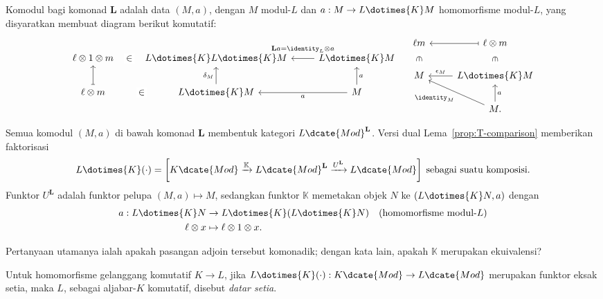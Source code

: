 Komodul bagi komonad $\mathbf{L}$ adalah data $(M,a)$, dengan $M$ modul-$L$
dan $a:M\to L\dotimes{K}M$ homomorfisme modul-$L$, yang disyaratkan membuat
diagram berikut komutatif:
\[\begin{tikzcd}
	\ell \otimes 1 \otimes m \arrow[phantom, r, "\in" description] & L \dotimes{K} L \dotimes{K} M & L \dotimes{K} M \arrow[l, "{\mathbf{L}a = \identity_L \otimes a}"' inner sep=0.6em] \\
	\ell \otimes m \arrow[phantom, r, "\in" description] \arrow[mapsto, u] & L \dotimes{K} M \arrow[u, "\delta_M"] & M \arrow[l, "a"] \arrow[u, "a"']
\end{tikzcd} \quad \begin{tikzcd}
	\ell m \arrow[phantom, d, "\in" description, sloped] & \ell \otimes m \arrow[phantom, d, "\in" description, sloped] \arrow[mapsto, l] \\
	M & L \dotimes{K} M \arrow[l, "\epsilon_M"'] \\
	& M. \arrow[lu, "\identity_M"] \arrow[u, "a"']
\end{tikzcd}\]

Semua komodul $(M,a)$ di bawah komonad $\mathbf{L}$ membentuk kategori
$L\dcate{Mod}^{\mathbf{L}}$. Versi dual Lema~\ref{prop:T-comparison}
memberikan faktorisasi
\[ L \dotimes{K} (\cdot) = \left[ K\dcate{Mod} \xrightarrow{\mathbb{K}} L\dcate{Mod}^{\mathbf{L}} \xrightarrow{U^{\mathbf{L}}} L\dcate{Mod} \right] \; \text{sebagai suatu komposisi}. \]
Funktor $U^{\mathbf{L}}$ adalah funktor pelupa $(M,a)\mapsto M$, sedangkan
funktor $\mathbb{K}$ memetakan objek $N$ ke $(L\dotimes{K}N,a)$ dengan
\begin{equation}\label{eqn:N-comonad-action}
	\begin{aligned}
		a: L \dotimes{K} N & \to L \dotimes{K} (L \dotimes{K} N) \quad \text{(homomorfisme modul-$L$)} \\
		\ell \otimes x & \mapsto \ell \otimes 1 \otimes x.
	\end{aligned}
\end{equation}

Pertanyaan utamanya ialah apakah pasangan adjoin tersebut komonadik; dengan
kata lain, apakah $\mathbb{K}$ merupakan ekuivalensi?

\begin{definition}
	Untuk homomorfisme gelanggang komutatif $K\to L$, jika
	$L\dotimes{K}(\mathord\cdot):K\dcate{Mod}\to L\dcate{Mod}$ merupakan
	funktor eksak setia, maka $L$, sebagai aljabar-$K$ komutatif, disebut
	\emph{datar setia}.
\end{definition}

